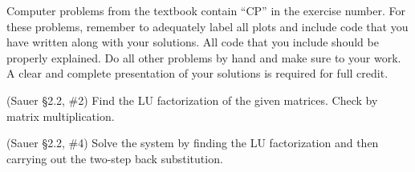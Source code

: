 \documentclass[12pt,fleqn]{exam}
\begin{document}
Computer problems from the textbook contain ``CP'' in the exercise number. For these problems, remember to adequately label all plots and include code that you have written along with your solutions. All code that you include should be properly explained. Do all other problems by hand and make sure to your work. A clear and complete presentation of your solutions is required for full credit.

\begin{questions}

\question (Sauer \S2.2, \#2) Find the LU factorization of the given matrices. Check by matrix multiplication.


\question (Sauer \S2.2, \#4) Solve the system by finding the LU factorization and then carrying out the two-step back
substitution.

\end{questions}
\end{document}
